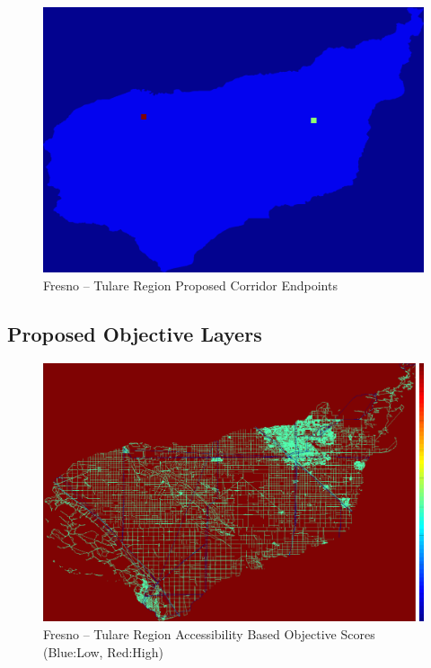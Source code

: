         \begin{figure}[!h]
            \begin{center}
            \includegraphics[width=5.5in]{figures/Fresno_Endpoints.png}   
            \caption{Fresno -- Tulare Region Proposed Corridor Endpoints}
            \label{fig:Fendpoints}
            \end{center}
        \end{figure}

    \subsection{Proposed Objective Layers}
    
        \begin{figure}[!h]
            \begin{center}
            \includegraphics[width=5.5in]{figures/Fresno_AccessibilityScore.png}   
            \caption{Fresno -- Tulare Region Accessibility Based Objective Scores (Blue:Low, Red:High)}
            \label{fig:Faccessibilty}
            \end{center}
        \end{figure}

